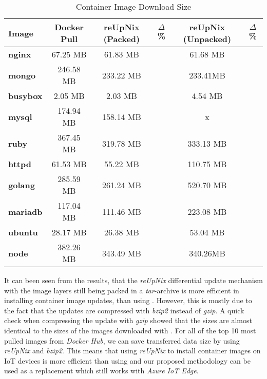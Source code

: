 \begin{table}[H]
	\centering
	\begin{tabular}{l|c|c|c|c|c}
	\toprule
	 Image & Docker Pull & reUpNix (Packed) & $\Delta$ \% & reUpNix (Unpacked) & $\Delta$ \%\\
	\midrule
    \textbf{nginx} & 67.25 MB & 61.83 MB & \color{ba-green}{- 8.0 \%} & 61.68 MB & \color{ba-green}{- 8.2 \%}\\
    \textbf{mongo} & 246.58 MB & 233.22 MB & \color{ba-green}{- 5.6 \%} & 233.41MB & \color{ba-green}{- 5.3 \%}\\
    \textbf{busybox} & 2.05 MB & 2.03 MB & \color{ba-green}{- 0.9 \%} & 4.54 MB & \color{ba-red}{+ 121.4 \%}\\
    \textbf{mysql} & 174.94 MB & 158.14 MB & \color{ba-green}{- 9.6 \%} & x & \color{ba-red}{+ x \%}\\
    \textbf{ruby} & 367.45 MB & 319.78 MB & \color{ba-green}{- 12.9 \%} & 333.13 MB & \color{ba-green}{- 9.3 \%}\\
    \textbf{httpd} & 61.53 MB & 55.22 MB & \color{ba-green}{- 10.2 \%} & 110.75 MB & \color{ba-red}{+ x \%}\\
    \textbf{golang} & 285.59 MB & 261.24 MB & \color{ba-green}{- 8.5 \%} & 520.70 MB & \color{ba-red}{+ x \%}\\
    \textbf{mariadb} & 117.04 MB & 111.46 MB & \color{ba-green}{- 4.7 \%} & 223.08 MB & \color{ba-red}{+ x \%}\\
    \textbf{ubuntu} & 28.17 MB & 26.38 MB & \color{ba-green}{- 6.3 \%} & 53.04 MB & \color{ba-red}{+ 84.7 \%}\\
    \textbf{node} & 382.26 MB & 343.49 MB & \color{ba-green}{- 10.1 \%} & 340.26MB & \color{ba-green}{- 10.9 \%}\\
	\bottomrule
	\end{tabular}
	\caption{Container Image Download Size}
	\label{tab:container-size}
\end{table}

\noindent
It can been seen from the results, that the \textit{reUpNix} differential update mechanism
with the image layers still being packed in a \textit{tar}-archive is more efficient
in installing container image updates, than using .
However, this is mostly due to the fact that the updates are compressed with \textit{bzip2}
instead of \textit{gzip}. A quick check when compressing the update with \textit{gzip}
showed that the sizes are almost identical to the sizes of the images downloaded
with .
For all of the top 10 most pulled images from \textit{Docker Hub}, we can save
transferred data size by using \textit{reUpNix} and \textit{bzip2}. This means
that using \textit{reUpNix} to install container images on \ac{IoT} devices is more
efficient than using  and our proposed methodology can be used
as a replacement which still works with \textit{Azure IoT Edge}.

